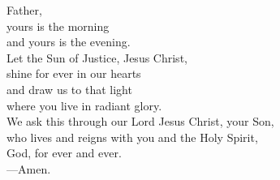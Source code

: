 \prayer


\begin{prayerverse}
Father,\\
yours is the morning\\
and yours is the evening.\\
Let the Sun of Justice, Jesus Christ,\\
shine for ever in our hearts\\
and draw us to that light\\
where you live in radiant glory.\\
We ask this through our Lord Jesus Christ, your Son,\\
who lives and reigns with you and the Holy Spirit,\\
God, for ever and ever.\\
{\color{red}---\thinspace}Amen.
\end{prayerverse}

